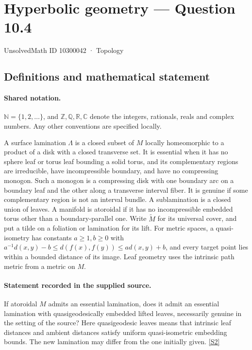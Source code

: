 \documentclass[11pt]{article}
\newcommand{\sref}[2]{\hyperlink{source:#1:#2}{[S#2]}}
\begin{document}
\setcounter{section}{10300041}
\section{Hyperbolic geometry — Question 10.4}\label{10300042}
{\small\sffamily UnsolvedMath ID 10300042 · Topology}
\subsection{Definitions and mathematical statement}

\paragraph{Shared notation.}$\mathbb N=\{1,2,\ldots\}$, and $\mathbb Z,\mathbb Q,\mathbb R,\mathbb C$ denote the integers, rationals, reals and complex numbers. Any other conventions are specified locally.


A surface lamination $\Lambda$ is a closed subset of $M$ locally homeomorphic to a product of a disk with a closed transverse set. It is essential when it has no sphere leaf or torus leaf bounding a solid torus, and its complementary regions are irreducible, have incompressible boundary, and have no compressing monogon. Such a monogon is a compressing disk with one boundary arc on a boundary leaf and the other along a transverse interval fiber. It is genuine if some complementary region is not an interval bundle. A sublamination is a closed union of leaves. A manifold is atoroidal if it has no incompressible embedded torus other than a boundary-parallel one. Write $\widetilde M$ for its universal cover, and put a tilde on a foliation or lamination for its lift. For metric spaces, a quasi-isometry has constants $a\ge1,b\ge0$ with $a^{-1}d(x,y)-b\le d(f(x),f(y))\le a d(x,y)+b$, and every target point lies within a bounded distance of its image. Leaf geometry uses the intrinsic path metric from a metric on $M$.
\paragraph{Statement recorded in the supplied source.}
If atoroidal $M$ admits an essential lamination, does it admit an essential lamination with quasigeodesically embedded lifted leaves, necessarily genuine in the setting of the source? Here quasigeodesic leaves means that intrinsic leaf distances and ambient distances satisfy uniform quasi-isometric embedding bounds. The new lamination may differ from the one initially given. \sref{10300042}{2}
\end{document}
